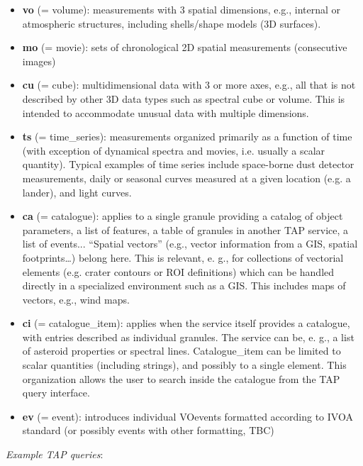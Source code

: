 \documentclass[11pt,a4paper]{ivoa}
\begin{document}
\begin{itemize}
\item \textbf{vo }(= volume): measurements with 3 spatial dimensions, e.g., internal or atmospheric structures, including shells/shape models (3D surfaces).

\item \textbf{mo }(= movie): sets of chronological 2D spatial measurements (consecutive images)

\item \textbf{cu }(= cube): multidimensional data with 3 or more axes, e.g., all that is not described by other 3D data types such as spectral cube or volume. This is intended to accommodate unusual data with multiple dimensions.

\item \textbf{ts }(= time\_series): measurements organized primarily as a function of time (with exception of dynamical spectra and movies, i.e. usually a scalar quantity). Typical examples of time series include space-borne dust detector measurements, daily or seasonal curves measured at a given location (e.g. a lander), and light curves.

\item \textbf{ca }(= catalogue): applies to a single granule providing a catalog of object parameters, a list of features, a table of granules in another TAP service, a list of events... ``Spatial vectors'' (e.g., vector information from a GIS, spatial footprints…) belong here. This is relevant, e. g., for collections of vectorial elements (e.g. crater contours or ROI definitions) which can be handled directly in a specialized environment such as a GIS. This includes maps of vectors, e.g., wind maps.

\item \textbf{ci }(= catalogue\_item): applies when the service itself provides a catalogue, with entries described as individual granules. The service can be, e. g., a list of asteroid properties or spectral lines. Catalogue\_item can be limited to scalar quantities (including strings), and possibly to a single element. This organization allows the user to search inside the catalogue from the TAP query interface.

\item \textbf{ev} (= event): introduces individual VOevents formatted according to IVOA standard (or possibly events with other formatting, TBC)

\end{itemize}


\emph{Example TAP queries}:
\end{document}
